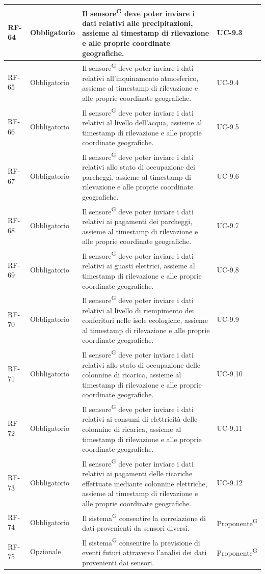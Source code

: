 \documentclass[8pt]{article}
\newcommand{\glossterm}[1]{#1\textsuperscript{G}} %
\begin{document}
\begin{longtable}{|>{\centering\arraybackslash}p{1.2cm}|>{\centering\arraybackslash}p{2cm}|>{\centering\arraybackslash}p{8.5cm}|>{\centering\arraybackslash}p{3cm}|}
            RF-64 & Obbligatorio & Il \glossterm{sensore} deve poter inviare i dati relativi alle precipitazioni, assieme al timestamp di rilevazione e alle proprie coordinate geografiche. & UC-9.3 \\ \hline
            RF-65 & Obbligatorio & Il \glossterm{sensore} deve poter inviare i dati relativi all'inquinamento atmosferico, assieme al timestamp di rilevazione e alle proprie coordinate geografiche. & UC-9.4 \\ \hline
            RF-66 & Obbligatorio & Il \glossterm{sensore} deve poter inviare i dati relativi al livello dell'acqua, assieme al timestamp di rilevazione e alle proprie coordinate geografiche. & UC-9.5 \\ \hline
            RF-67 & Obbligatorio & Il \glossterm{sensore} deve poter inviare i dati relativi allo stato di occupazione dei parcheggi, assieme al timestamp di rilevazione e alle proprie coordinate geografiche. & UC-9.6 \\ \hline
            RF-68 & Obbligatorio & Il \glossterm{sensore} deve poter inviare i dati relativi ai pagamenti dei parcheggi, assieme al timestamp di rilevazione e alle proprie coordinate geografiche. & UC-9.7 \\ \hline
            RF-69 & Obbligatorio & Il \glossterm{sensore} deve poter inviare i dati relativi ai guasti elettrici, assieme al timestamp di rilevazione e alle proprie coordinate geografiche. & UC-9.8 \\ \hline
            RF-70 & Obbligatorio & Il \glossterm{sensore} deve poter inviare i dati relativi al livello di riempimento dei conferitori nelle isole ecologiche, assieme al timestamp di rilevazione e alle proprie coordinate geografiche. & UC-9.9 \\ \hline
            RF-71 & Obbligatorio & Il \glossterm{sensore} deve poter inviare i dati relativi allo stato di occupazione delle colonnine di ricarica, assieme al timestamp di rilevazione e alle proprie coordinate geografiche. & UC-9.10 \\ \hline
            RF-72 & Obbligatorio & Il \glossterm{sensore} deve poter inviare i dati relativi ai consumi di elettricità delle colonnine di ricarica, assieme al timestamp di rilevazione e alle proprie coordinate geografiche. & UC-9.11 \\ \hline
            RF-73 & Obbligatorio & Il \glossterm{sensore} deve poter inviare i dati relativi ai pagamenti delle ricariche effettuate mediante colonnine elettriche, assieme al timestamp di rilevazione e alle proprie coordinate geografiche. & UC-9.12 \\ \hline
            RF-74 & Obbligatorio & Il \glossterm{sistema} consentire la correlazione di dati provenienti da sensori diversi. & \glossterm{Proponente} \\ \hline
            RF-75 & Opzionale & Il \glossterm{sistema} consentire la previsione di eventi futuri attraverso l'analisi dei dati provenienti dai sensori. & \glossterm{Proponente} \\ \hline
\end{longtable}
\clearpage
\end{document}
